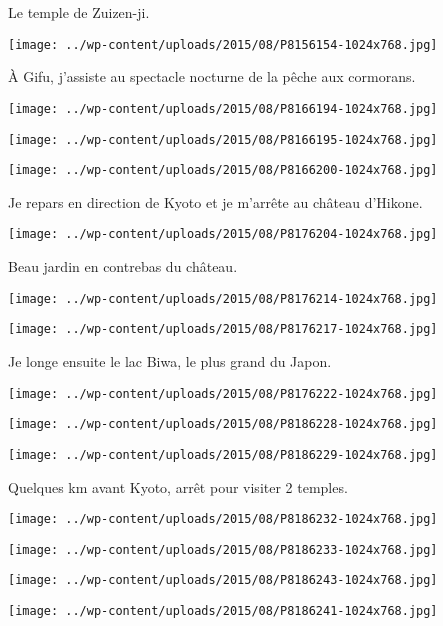 Le temple de Zuizen-ji.
\begin{center} \texttt{[image: ../wp-content/uploads/2015/08/P8156154-1024x768.jpg]} \end{center}

\pagebreak
 \`A Gifu, j'assiste au spectacle nocturne de la pêche aux cormorans. 
\begin{center} \texttt{[image: ../wp-content/uploads/2015/08/P8166194-1024x768.jpg]} \end{center}
\begin{center} \texttt{[image: ../wp-content/uploads/2015/08/P8166195-1024x768.jpg]} \end{center}
\begin{center} \texttt{[image: ../wp-content/uploads/2015/08/P8166200-1024x768.jpg]} \end{center}

 Je repars en direction de Kyoto et je m'arrête au château d'Hikone.
\begin{center} \texttt{[image: ../wp-content/uploads/2015/08/P8176204-1024x768.jpg]} \end{center}

\pagebreak
 Beau jardin en contrebas du château.
\begin{center} \texttt{[image: ../wp-content/uploads/2015/08/P8176214-1024x768.jpg]} \end{center}
\begin{center} \texttt{[image: ../wp-content/uploads/2015/08/P8176217-1024x768.jpg]} \end{center}

\pagebreak
 Je longe ensuite le lac Biwa, le plus grand du Japon.
\begin{center} \texttt{[image: ../wp-content/uploads/2015/08/P8176222-1024x768.jpg]} \end{center}
\begin{center} \texttt{[image: ../wp-content/uploads/2015/08/P8186228-1024x768.jpg]} \end{center}
\begin{center} \texttt{[image: ../wp-content/uploads/2015/08/P8186229-1024x768.jpg]} \end{center}

 Quelques km avant Kyoto, arrêt pour visiter 2 temples.
\begin{center} \texttt{[image: ../wp-content/uploads/2015/08/P8186232-1024x768.jpg]} \end{center}
\begin{center} \texttt{[image: ../wp-content/uploads/2015/08/P8186233-1024x768.jpg]} \end{center}
\begin{center} \texttt{[image: ../wp-content/uploads/2015/08/P8186243-1024x768.jpg]} \end{center}
\begin{center} \texttt{[image: ../wp-content/uploads/2015/08/P8186241-1024x768.jpg]} \end{center}

